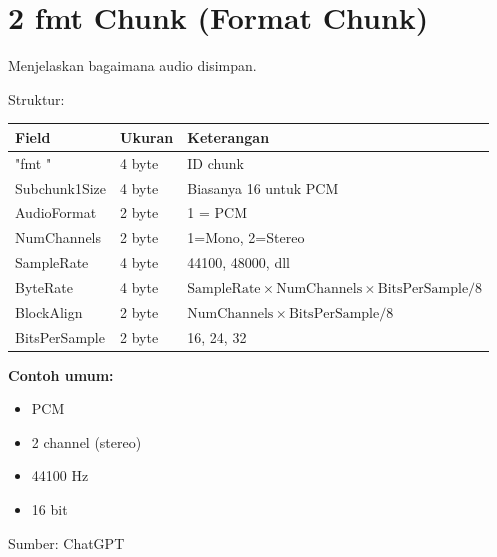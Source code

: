 \documentclass{article}
\begin{document}

\section*{2 fmt Chunk (Format Chunk)}

Menjelaskan bagaimana audio disimpan.

Struktur:

\begin{tabular}{lll}
\textbf{Field} & \textbf{Ukuran} & \textbf{Keterangan} \\ \hline
"fmt " & 4 byte & ID chunk \\
Subchunk1Size & 4 byte & Biasanya 16 untuk PCM \\
AudioFormat & 2 byte & 1 = PCM \\
NumChannels & 2 byte & 1=Mono, 2=Stereo \\
SampleRate & 4 byte & 44100, 48000, dll \\
ByteRate & 4 byte & $\text{SampleRate} \times \text{NumChannels} \times \text{BitsPerSample}/8$ \\
BlockAlign & 2 byte & $\text{NumChannels} \times \text{BitsPerSample}/8$ \\
BitsPerSample & 2 byte & 16, 24, 32 \\
\end{tabular}

\vspace{20mm}

\begin{flushright}
\textbf{Contoh umum:}
\begin{itemize}
    \item PCM
    \item 2 channel (stereo)
    \item 44100 Hz
    \item 16 bit
\end{itemize}

Sumber: ChatGPT
\end{flushright}
\end{document}
